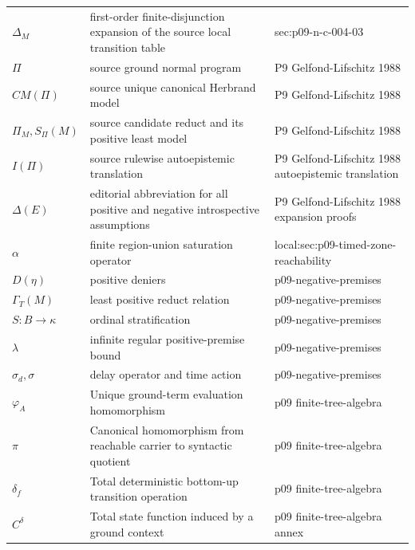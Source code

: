 \begin{longtable}{@{}p{}p{}p{}@{}}
\(\Delta_M\) & first-order finite-disjunction expansion of the source local transition table & sec:\allowbreak{}p09-\allowbreak{}n-\allowbreak{}c-\allowbreak{}004-\allowbreak{}03 \\
\(\Pi\) & source ground normal program & P9 Gelfond-\allowbreak{}Lifschitz 1988 \\
\(CM(\Pi)\) & source unique canonical Herbrand model & P9 Gelfond-\allowbreak{}Lifschitz 1988 \\
\(\Pi_M,\allowbreak S_\Pi(M)\) & source candidate reduct and its positive least model & P9 Gelfond-\allowbreak{}Lifschitz 1988 \\
\(I(\Pi)\) & source rulewise autoepistemic translation & P9 Gelfond-\allowbreak{}Lifschitz 1988 autoepistemic translation \\
\(\Delta(E)\) & editorial abbreviation for all positive and negative introspective assumptions & P9 Gelfond-\allowbreak{}Lifschitz 1988 expansion proofs \\
\(\alpha\) & finite region-union saturation operator & local:\allowbreak{}sec:\allowbreak{}p09-\allowbreak{}timed-\allowbreak{}zone-\allowbreak{}reachability \\
\(D(\eta)\) & positive deniers & p09-\allowbreak{}negative-\allowbreak{}premises \\
\(\Gamma_T(M)\) & least positive reduct relation & p09-\allowbreak{}negative-\allowbreak{}premises \\
\(S:B\to\kappa\) & ordinal stratification & p09-\allowbreak{}negative-\allowbreak{}premises \\
\(\lambda\) & infinite regular positive-premise bound & p09-\allowbreak{}negative-\allowbreak{}premises \\
\(\sigma_d,\allowbreak \sigma\) & delay operator and time action & p09-\allowbreak{}negative-\allowbreak{}premises \\
\ensuremath{\varphi_A} & Unique ground-term evaluation homomorphism & p09 finite-\allowbreak{}tree-\allowbreak{}algebra \\
\ensuremath{\pi} & Canonical homomorphism from reachable carrier to syntactic quotient & p09 finite-\allowbreak{}tree-\allowbreak{}algebra \\
\ensuremath{\delta_f} & Total deterministic bottom-up transition operation & p09 finite-\allowbreak{}tree-\allowbreak{}algebra \\
\ensuremath{C^\delta} & Total state function induced by a ground context & p09 finite-\allowbreak{}tree-\allowbreak{}algebra annex \\

\end{longtable}
